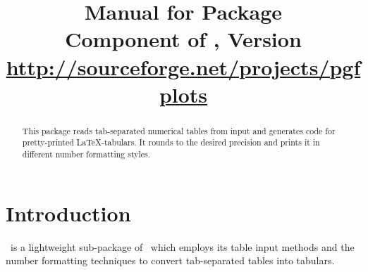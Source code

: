 %
%
%
% 
% 
%
%



\usepackage{array}
\usepackage{colortbl}
\usepackage{booktabs}
\usepackage{eurosym}



\title{%
	Manual for Package \PGFPlotstable\\
	{\small Component of \PGFPlots, Version \pgfplotsversion}\\
	{\small\href{http://sourceforge.net/projects/pgfplots}{http://sourceforge.net/projects/pgfplots}}}


\maketitle
\begin{abstract}%
	This package reads tab-separated numerical tables from input and generates code for pretty-printed \LaTeX-tabulars. It rounds to the desired precision and prints it in different number formatting styles.
\end{abstract}
\tableofcontents
\section{Introduction}
\PGFPlotstable\ is a lightweight sub-package of \PGFPlots\ which employs its table input methods and the number formatting techniques to convert tab-separated tables into tabulars.

